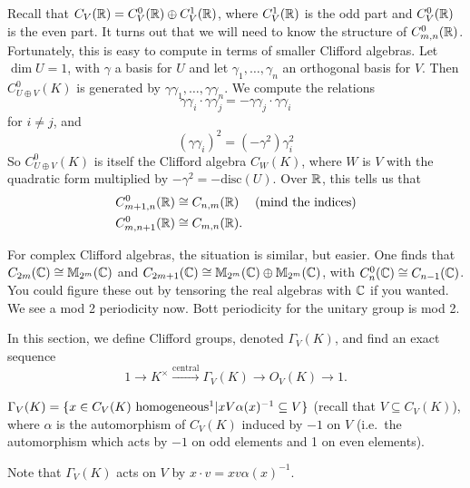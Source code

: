  Recall that $C_V(\mathbb{R})=C^0_V(\mathbb{R})\oplus C^1_V(\mathbb{R})$, where $C^1_V(\mathbb{R})$ is the odd part
 and $C^0_V(\mathbb{R})$ is the even part. It turns out that we will need to know the structure
 of $C^0_{m,n}(\mathbb{R})$. Fortunately, this is easy to compute in terms of smaller Clifford
 algebras. Let $\dim U=1$, with $\gamma$ a basis for $U$ and let $\gamma_1,\dots,
 \gamma_n$ an orthogonal basis for $V$. Then $C^0_{U\oplus V}(K)$ is generated by
 $\gamma\gamma_1,\dots, \gamma\gamma_n$. We compute the relations
 \[
    \gamma\gamma_i\cdot \gamma\gamma_j = -\gamma\gamma_j\cdot \gamma\gamma_i
 \]
 for $i\neq j$, and
 \[
    (\gamma\gamma_i)^2 = (-\gamma^2)\gamma_i^2
 \]
 So $C_{U\oplus V}^0(K)$ is itself the Clifford algebra $C_{W}(K)$, where $W$ is $V$ with
 the quadratic form multiplied by $-\gamma^2 = -\text{disc}(U)$. Over $\mathbb{R}$, this tells
 us that
 \begin{align*}
   C^0_{m+1,n}(\mathbb{R}) &\cong C_{n,m}(\mathbb{R}) & \text{(mind the indices)} \\
   C^0_{m,n+1}(\mathbb{R}) &\cong C_{m,n}(\mathbb{R}).
 \end{align*}

 \begin{remark}
   For complex Clifford algebras, the situation is similar, but easier. One finds that
   $C_{2m}(\mathbb{C})\cong \mathbb{M}_{2^m}(\mathbb{C})$ and $C_{2m+1}(\mathbb{C}) \cong \mathbb{M}_{2^m}(\mathbb{C})\oplus
   \mathbb{M}_{2^m}(\mathbb{C})$, with $C_n^0(\mathbb{C})\cong C_{n-1}(\mathbb{C})$. You could figure these out by
   tensoring the real algebras with $\mathbb{C}$ if you wanted. We see a mod 2 periodicity now.
   Bott periodicity for the unitary group is mod 2.
 \end{remark}

 In this section, we define Clifford groups, denoted $\Gamma_V(K)$, and find an exact
 sequence
 \[
    1\to K^\times \xrightarrow{\mathrm{central}} \Gamma_V(K) \to O_V(K)\to 1.
 \]
 \begin{definition}
   $\Gamma_V(K) = \{x\in C_V(K) \text{ homogeneous\footnotemark} |
   xV\alpha(x)^{-1}\subseteq V\}$ 
   (recall that $V\subseteq C_V(K)$), where $\alpha$ is the automorphism of $C_V(K)$
   induced by $-1$ on $V$ (i.e.\ the automorphism which acts by $-1$ on odd elements and
   1 on even elements).
 \end{definition}
   Note that $\Gamma_V(K)$ acts on $V$ by $x\cdot v = xv\alpha(x)^{-1}$.

